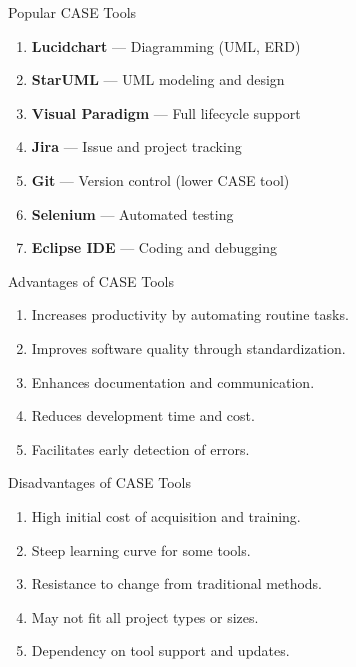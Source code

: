 \documentclass[14pt, aspectratio=169]{beamer}
\begin{document}
\begin{frame}{Popular CASE Tools}
	\begin{enumerate}
		\item \textbf{Lucidchart} — Diagramming (UML, ERD) \pause
		\item \textbf{StarUML} — UML modeling and design \pause
		\item \textbf{Visual Paradigm} — Full lifecycle support \pause
		\item \textbf{Jira} — Issue and project tracking \pause
		\item \textbf{Git} — Version control (lower CASE tool) \pause
		\item \textbf{Selenium} — Automated testing \pause
		\item \textbf{Eclipse IDE} — Coding and debugging
	\end{enumerate}
\end{frame}

\begin{frame}{Advantages of CASE Tools}
	\begin{enumerate}
		\item<1-> Increases productivity by automating routine tasks. \pause
		\item<2-> Improves software quality through standardization. \pause
		\item<3-> Enhances documentation and communication. \pause
		\item<4-> Reduces development time and cost. \pause
		\item<5-> Facilitates early detection of errors.
	\end{enumerate}
\end{frame}

\begin{frame}{Disadvantages of CASE Tools}
	\begin{enumerate}
		\item<1-> High initial cost of acquisition and training. \pause
		\item<2-> Steep learning curve for some tools. \pause
		\item<3-> Resistance to change from traditional methods. \pause
		\item<4-> May not fit all project types or sizes. \pause
		\item<5-> Dependency on tool support and updates.
	\end{enumerate}
\end{frame}
\end{document}
